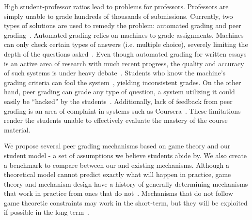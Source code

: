 \documentclass{sigchi}
\begin{document}
High student-professor ratios lead to problems for professors. Professors are simply unable to grade hundreds of thousands of submissions. Currently, two types of solutions are used to remedy the problem: automated grading and peer grading~\cite{edxsoftware}. Automated grading relies on machines to grade assignments. Machines can only check certain types of answers (i.e. multiple choice), severely limiting the depth of the questions asked~\cite{rightandwrongMOOCs}. Even though automated grading for written essays is an active area of research with much recent progress, the quality and accuracy of such systems is under heavy debate~\cite{automatedsystemssuck}. Students who know the machine's grading criteria can fool the system~\cite{robogradingproblems}, yielding inconsistent grades.  On the other hand, peer grading can grade any type of question, a system utilizing it could easily be ``hacked'' by the students~\cite{makingsenseofMOOCs}. Additionally, lack of feedback from peer grading is an area of complaint in systems such as Coursera~\cite{howaccurateispeergrading}. These limitations render the students unable to effectively evaluate the mastery of the course material. 

We propose several peer grading mechanisms based on game theory and our student model - a set of assumptions we believe students abide by. We also create a benchmark to compare between our and existing mechanisms. Although a theoretical model cannot predict exactly what will happen in practice, game theory and mechanism design have a history of generally determining mechanisms that work in practice from ones that do not~\cite{AGTbook}. Mechanisms that do not follow game theoretic constraints may work in the short-term, but they will be exploited if possible in the long term~\cite{boycottfinal}.
\end{document}
